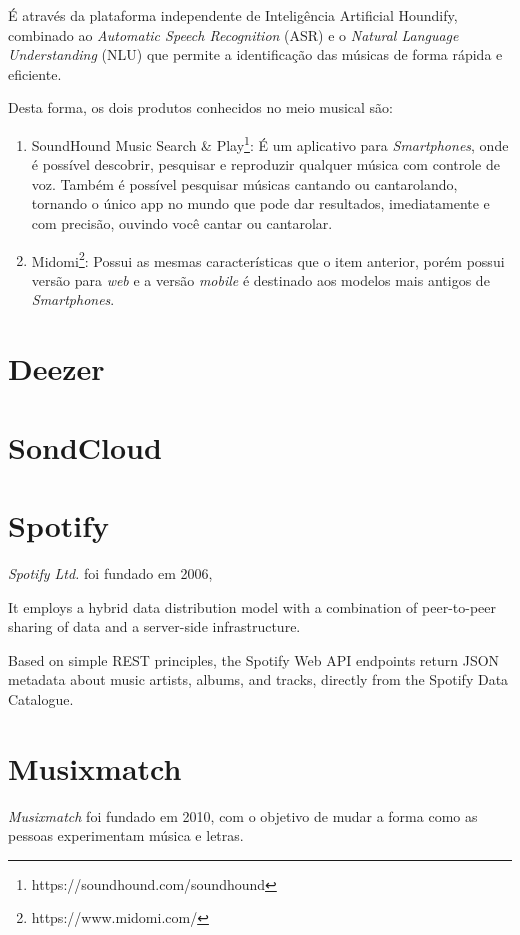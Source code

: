 É através da plataforma independente de Inteligência Artificial Houndify, combinado ao \textit{Automatic Speech Recognition} (ASR) e o \textit{Natural Language Understanding} (NLU) que permite a identificação das músicas de forma rápida e eficiente.

Desta forma, os dois produtos conhecidos no meio musical são:

\begin{enumerate}
    \item SoundHound Music Search \& Play\footnote{https://soundhound.com/soundhound}: É um aplicativo para \textit{Smartphones}, onde é possível descobrir, pesquisar e reproduzir qualquer música com controle de voz. Também é possível pesquisar músicas cantando ou cantarolando, tornando o único app no mundo que pode dar resultados, imediatamente e com precisão, ouvindo você cantar ou cantarolar.
    \item Midomi\footnote{https://www.midomi.com/}: Possui as mesmas características que o item anterior, porém possui versão para \textit{web} e a versão \textit{mobile} é destinado aos modelos mais antigos de \textit{Smartphones}.
\end{enumerate}

\section{Deezer}

\section{SondCloud}

\section{Spotify}
\textit{Spotify Ltd.} foi fundado em 2006, 

It employs a hybrid data
distribution model with a combination of peer-to-peer sharing
of data and a server-side infrastructure.

Based on simple REST principles, the Spotify Web API endpoints return JSON metadata about music artists, albums, and tracks, directly from the Spotify Data Catalogue.

\section{Musixmatch}
\textit{Musixmatch} foi fundado em 2010, com o objetivo de mudar a forma como as pessoas experimentam música e letras.

